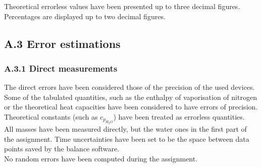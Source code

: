 \documentclass[a4paper, 12pt]{article}
\begin{document}
	Theoretical errorless values have been presented up to three decimal figures. Percentages are displayed up to two decimal figures.
	\subsection{A.3 Error estimations}
	\subsubsection{A.3.1 Direct measurements}
	The direct errors have been considered those of the precision of the used devices. \\
	
	Some of the tabulated quantities, such as the enthalpy of vaporisation of nitrogen or the theoretical heat capacities have been considered to have errors of precision. Theoretical constants (such as $c_{p_{H_2O}}$) have been treated as errorless quantities. \\
	
	All masses have been measured directly, but the water ones in the first part of the assignment. Time uncertainties have been set to be the space between data points saved by the balance software.\\
	
	No random errors have been computed during the assignment.
\end{document}
